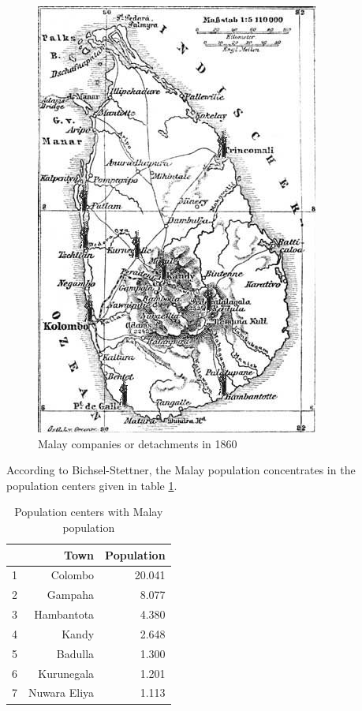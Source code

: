 \begin{figure}
    \centering
        \includegraphics[height=0.3\textheight]{pics/malaycomp}
    \caption{Malay companies or detachments in 1860}
    \label{fig:malaypop1860}
\end{figure}

According to Bichsel-Stettner, the Malay population concentrates in the population centers given in table \ref{tab:MalayPopCtr}.
\begin{table}
    \centering
        \begin{tabular}{lrr}
          & Town & Population\\
        \hline
        1 & Colombo & 20.041\\
        2 & Gampaha & 8.077\\
        3 & Hambantota & 4.380\\
        4 & Kandy & 2.648\\
        5 & Badulla & 1.300\\
        6 & Kurunegala & 1.201\\
        7 & Nuwara Eliya & 1.113\\
        \end{tabular}
        \caption{Population centers with Malay population}
        \label{tab:MalayPopCtr}
\end{table}

